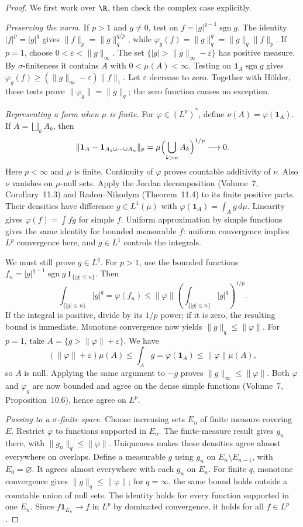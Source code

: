 \begin{proof}
We first work over $\R$, then check the complex case explicitly.

\emph{Preserving the norm.} If $p>1$ and $g\ne0$, test on $f=|g|^{q-1}\operatorname{sgn}g$. The identity $|f|^p=|g|^q$ gives $\|f\|_p=\|g\|_q^{q/p}$, while $\varphi_g(f)=\|g\|_q^q=\|g\|_q\|f\|_p$. If $p=1$, choose $0<\varepsilon<\|g\|_\infty$. The set $\{|g|>\|g\|_\infty-\varepsilon\}$ has positive measure. By $\sigma$-finiteness it contains $A$ with $0<\mu(A)<\infty$. Testing on $\mathbf 1_A\operatorname{sgn}g$ gives $\varphi_g(f)\ge(\|g\|_\infty-\varepsilon)\|f\|_1$. Let $\varepsilon$ decrease to zero. Together with H\"older, these tests prove $\|\varphi_g\|=\|g\|_q$; the zero function causes no exception.

\emph{Representing a form when $\mu$ is finite.} For $\varphi\in(L^p)^*$, define $\nu(A)=\varphi(\mathbf 1_A)$. If $A=\bigsqcup_kA_k$, then
\[\|\mathbf 1_A-\mathbf 1_{A_1\cup\cdots\cup A_n}\|_p=\mu\Bigl(\bigcup_{k>n}A_k\Bigr)^{1/p}\longrightarrow0.\]
Here $p<\infty$ and $\mu$ is finite. Continuity of $\varphi$ proves countable additivity of $\nu$. Also $\nu$ vanishes on $\mu$-null sets. Apply the Jordan decomposition (Volume~7, Corollary~11.3) and Radon--Nikodym (Theorem~11.4) to its finite positive parts. Their densities have difference $g\in L^1(\mu)$ with $\varphi(\mathbf 1_A)=\int_Ag\,d\mu$. Linearity gives $\varphi(f)=\int fg$ for simple $f$. Uniform approximation by simple functions gives the same identity for bounded measurable $f$: uniform convergence implies $L^p$ convergence here, and $g\in L^1$ controls the integrals.

We must still prove $g\in L^q$. For $p>1$, use the bounded functions $f_n=|g|^{q-1}\operatorname{sgn}g\,\mathbf 1_{\{|g|\le n\}}$. Then
\[\int_{\{|g|\le n\}}|g|^q=\varphi(f_n)\le\|\varphi\|\left(\int_{\{|g|\le n\}}|g|^q\right)^{1/p}.\]
If the integral is positive, divide by its $1/p$ power; if it is zero, the resulting bound is immediate. Monotone convergence now yields $\|g\|_q\le\|\varphi\|$. For $p=1$, take $A=\{g>\|\varphi\|+\varepsilon\}$. We have
\[(\|\varphi\|+\varepsilon)\mu(A)\le\int_Ag=\varphi(\mathbf 1_A)\le\|\varphi\|\mu(A),\]
so $A$ is null. Applying the same argument to $-g$ proves $\|g\|_\infty\le\|\varphi\|$. Both $\varphi$ and $\varphi_g$ are now bounded and agree on the dense simple functions (Volume~7, Proposition~10.6), hence agree on $L^p$.

\emph{Passing to a $\sigma$-finite space.} Choose increasing sets $E_n$ of finite measure covering $E$. Restrict $\varphi$ to functions supported in $E_n$. The finite-measure result gives $g_n$ there, with $\|g_n\|_q\le\|\varphi\|$. Uniqueness makes these densities agree almost everywhere on overlaps. Define a measurable $g$ using $g_n$ on $E_n\setminus E_{n-1}$, with $E_0=\varnothing$. It agrees almost everywhere with each $g_n$ on $E_n$. For finite $q$, monotone convergence gives $\|g\|_q\le\|\varphi\|$; for $q=\infty$, the same bound holds outside a countable union of null sets. The identity holds for every function supported in one $E_n$. Since $f\mathbf 1_{E_n}\to f$ in $L^p$ by dominated convergence, it holds for all $f\in L^p$.


\end{proof}
